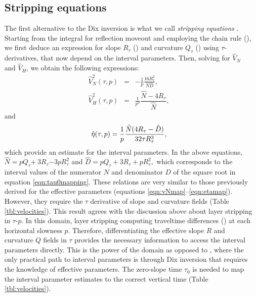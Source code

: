 \subsection{Stripping equations}
The first alternative to the Dix inversion is what we call
\textit{stripping equations} \citep{casasantafomel}. Starting from the integral
 for \taup reflection moveout and employing the chain
rule (), we first deduce an expression for slope
$R_{\tau}$ () and curvature $Q_{\tau}$ () using
$\tau$-derivatives, that now depend on the interval parameters. Then,
solving for $\hat{V}_{N}$ and $\hat{V}_{H}$, we obtain the following
expressions:
\begin{eqnarray}
\hat{V}_{N}^{2}(\tau, p) &=&-\frac{1}{p}\frac{{16R_{{\tau }}^{3}}}{{\hat{N}\hat{D}}},
\label{eqn:strippingVN} \\
\hat{V}_{H}^{2}(\tau, p) &=&\frac{1}{{p^{2}}}\dfrac{{\hat{N}-4R}_{{\tau }}}{{\hat{N}}}%
,  \label{eqn:strippingVH}
\end{eqnarray}
and
\begin{equation}
\hat{\eta}(\tau, p)=\frac{1}{p}\frac{{\hat{N}(4{R}_{{\tau }}-\hat{D})}}{{32\tau {R}_{{%
\tau }}^{3}}},  \label{eqn:strippingETA}
\end{equation}
which provide an estimate for the interval parameters. In the above equations,
$\hat{N}={pQ}_{{\tau }}{+~3R}_{{\tau }}{-3p{R}_{{\tau }}^{2}}$
and 
$\hat{D}=p{Q}_{{\tau }}+3{R}_{{\tau }}+p{{R}_{{\tau }}^{2}},$
which corresponds to the interval values of the numerator $N$ and
denominator $D$ of the square root in equation \ref{eqn:tau0mapping}.
These relations are very similar to those previously derived for the
effective parameters (equations
\ref{eqn:vNmap}--\ref{eqn:etamap}). However, they require the $\tau$
derivative of  slope and curvature fields (Table
\ref{tbl:velocities}). This result agrees with the discussion above
about layer stripping in $\tau$-$p$. In this domain, layer stripping
  computing traveltime differences
() at each horizontal slowness $p$. Therefore,
differentiating the effective slope $R$ and curvature $Q$ fields in
$\tau$ provides the necessary information to access the interval
parameters directly. This is the power of the \taup domain as opposed
to \tx, where the only practical path to interval parameters is
through Dix inversion that requires the knowledge of effective
parameters. The zero-slope time $\tau_0$  is needed to map the
interval parameter estimates to the correct vertical time (Table
\ref{tbl:velocities}).

